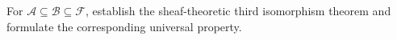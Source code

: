 \begin{problem}
For $\mathcal A\subseteq\mathcal B\subseteq\mathcal F$, establish the sheaf-theoretic third isomorphism theorem and formulate the corresponding universal property.
\end{problem}
